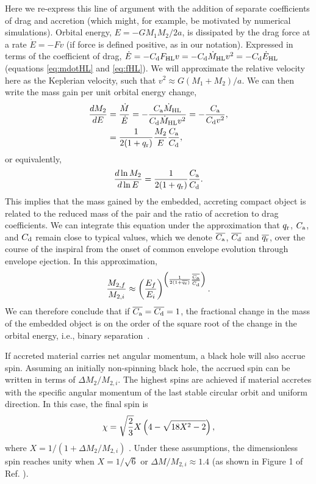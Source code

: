 Here we re-express this line of argument with the addition of separate coefficients of drag and accretion (which might, for example, be motivated by numerical simulations). Orbital energy, $E = -GM_1 M_2 / 2 a$, is dissipated by the drag force at a rate $\dot E = - F v$ (if force is defined positive, as in our notation). Expressed in terms of the coefficient of drag, $\dot E = - C_{\rm d} F_{\rm HL} v = - C_{\rm d} \dot M_{\rm HL} v^2 = - C_{\rm d} \dot E_{\rm HL}$ (equations \eqref{eq:mdotHL} and \eqref{eq:fHL}). We will approximate the relative velocity here as the Keplerian velocity, such that $v^2 \approx G(M_1 + M_2)/a$. We can then write the mass gain per unit orbital energy change,
\begin{align}
\frac{dM_2}{dE} &=\frac{\dot M}{\dot E} = - \frac{C_{\rm a} \dot M_{\rm HL} }{C_{\rm d} \dot M_{\rm HL} v^2} = - \frac{C_{\rm a}  }{C_{\rm d}  v^2}, \nonumber \\
& = \frac{1}{2(1+q_{\rm r})} \frac{M_2}{E} \frac{C_{\rm a}  }{C_{\rm d} },
\end{align}
or equivalently, 
\begin{equation}\label{eq:dlnMdE}
 \frac{d \ln M_2}{d \ln E}   = \frac{1}{2(1+q_{\rm r})} \frac{C_{\rm a}  }{C_{\rm d} }.
\end{equation}
This implies that the mass gained by the embedded, accreting compact object is related to the reduced mass of the pair and the ratio of accretion to drag coefficients. 
We can integrate this equation under the approximation that $q_{\rm r}$, $C_{\rm a}$, and $C_{\rm d}$ remain close to typical values, which we denote $\overline{C_{\rm a}}$, $\overline{C_{\rm d}}$ and $\overline{q_{\rm r}}$, over the course of the inspiral from the onset of common envelope evolution through envelope ejection.  In this approximation,
\begin{equation}\label{eq:MEsolution}
\frac{M_{2,f}}{M_{2,i}} \approx \left(\frac{E_f}{E_i}\right)^ {\left(\frac{1}{2(1 +\overline{q_{\rm r}})} \frac{\overline{C_{\rm a}}}{\overline{C_{\rm d}}}\right)}.
\end{equation}
We can therefore conclude that if $\overline{C_{\rm a}}=\overline{C_{\rm d}}=1$, the fractional change in the mass of the embedded object is on the order of the square root of the change in the orbital energy, i.e., binary separation~\cite{Chevalier:1993,Brown:1995,Bethe:1998}. 

If accreted material carries net angular momentum, a black hole will also accrue spin. Assuming an initially non-spinning black hole, the accrued spin can be written in terms of $\Delta M_2 / M_{2,i}$. The highest spins are achieved if material accretes with the specific angular momentum of the last stable circular orbit and uniform direction. In this case, the final spin is 
\begin{equation}\label{eq:aspin}
    \chi = \sqrt{2 \over 3} X \left( 4 - \sqrt{18 X^2 - 2} \right),
\end{equation}
where $X=1/(1 + \Delta M_2 / M_{2,i})$  \cite{kingkolb:1999}.
Under these assumptions, the dimensionless spin reaches unity when $X = 1/\sqrt{6}$ or $\Delta M / M_{2,i}\approx 1.4$ (as shown in Figure 1 of Ref. \cite{kingkolb:1999}). 

